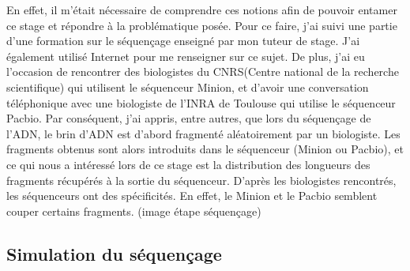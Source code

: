 \documentclass[11pt,a4paper]{article} %
\begin{document}
En effet, il m'était nécessaire de comprendre ces notions afin de pouvoir entamer ce stage et répondre à la problématique posée.  Pour ce faire, j'ai suivi une partie d'une formation sur le séquençage enseigné par mon tuteur de stage. J'ai également utilisé Internet pour me renseigner sur ce sujet. De plus, j'ai eu l'occasion de rencontrer des biologistes du CNRS(Centre national de la recherche scientifique) qui utilisent le séquenceur Minion, et d'avoir une conversation téléphonique avec une biologiste de l'INRA de Toulouse qui utilise le séquenceur Pacbio. Par conséquent, j'ai appris, entre autres, que lors du séquençage de l'ADN, le brin d'ADN est d'abord fragmenté aléatoirement par un biologiste. Les fragments obtenus sont alors introduits dans le séquenceur (Minion ou Pacbio), et ce qui nous a intéressé lors de ce stage est la distribution des longueurs des fragments récupérés à la sortie du séquenceur. D'après les biologistes rencontrés, les séquenceurs ont des spécificités. En effet, le Minion et le Pacbio semblent couper certains fragments. (image étape séquençage)

\subsection{Simulation du séquençage}
\end{document}
